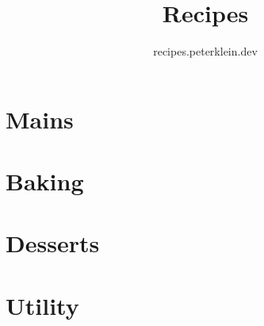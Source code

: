 \documentclass{book}
\title{Recipes}
\author{recipes.peterklein.dev}
\date{}
\begin{document}
\maketitle
\tableofcontents
\thispagestyle{bookdatestyle}

\part{Mains}




\part{Baking}




\part{Desserts}





\part{Utility}


\end{document}
